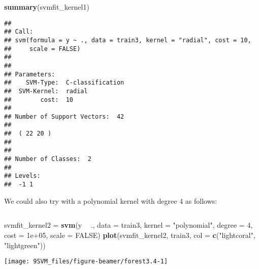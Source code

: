 \documentclass[10pt,ignorenonframetext,]{beamer}
\newenvironment{Shaded}{\begin{snugshade}}{\end{snugshade}}
\newcommand{\DataTypeTok}[1]{\textcolor[rgb]{0.13,0.29,0.53}{#1}}
\newcommand{\DecValTok}[1]{\textcolor[rgb]{0.00,0.00,0.81}{#1}}
\newcommand{\FloatTok}[1]{\textcolor[rgb]{0.00,0.00,0.81}{#1}}
\newcommand{\KeywordTok}[1]{\textcolor[rgb]{0.13,0.29,0.53}{\textbf{#1}}}
\newcommand{\NormalTok}[1]{#1}
\newcommand{\OperatorTok}[1]{\textcolor[rgb]{0.81,0.36,0.00}{\textbf{#1}}}
\newcommand{\OtherTok}[1]{\textcolor[rgb]{0.56,0.35,0.01}{#1}}
\newcommand{\StringTok}[1]{\textcolor[rgb]{0.31,0.60,0.02}{#1}}
\begin{document}
\begin{frame}[fragile]

\scriptsize

\begin{Shaded}
\begin{Highlighting}[]
\KeywordTok{summary}\NormalTok{(svmfit_kernel1)}
\end{Highlighting}
\end{Shaded}

\begin{verbatim}
## 
## Call:
## svm(formula = y ~ ., data = train3, kernel = "radial", cost = 10, 
##     scale = FALSE)
## 
## 
## Parameters:
##    SVM-Type:  C-classification 
##  SVM-Kernel:  radial 
##        cost:  10 
## 
## Number of Support Vectors:  42
## 
##  ( 22 20 )
## 
## 
## Number of Classes:  2 
## 
## Levels: 
##  -1 1
\end{verbatim}

\normalsize

\end{frame}

\begin{frame}[fragile]

We could also try with a polynomial kernel with degree 4 as follows:

\(~\)

\scriptsize

\begin{Shaded}
\begin{Highlighting}[]
\NormalTok{svmfit_kernel2 =}\StringTok{ }\KeywordTok{svm}\NormalTok{(y }\OperatorTok{~}\StringTok{ }\NormalTok{., }\DataTypeTok{data =}\NormalTok{ train3, }\DataTypeTok{kernel =} \StringTok{"polynomial"}\NormalTok{, }\DataTypeTok{degree =} \DecValTok{4}\NormalTok{, }
    \DataTypeTok{cost =} \FloatTok{1e+05}\NormalTok{, }\DataTypeTok{scale =} \OtherTok{FALSE}\NormalTok{)}
\KeywordTok{plot}\NormalTok{(svmfit_kernel2, train3, }\DataTypeTok{col =} \KeywordTok{c}\NormalTok{(}\StringTok{"lightcoral"}\NormalTok{, }\StringTok{"lightgreen"}\NormalTok{))}
\end{Highlighting}
\end{Shaded}

\begin{center}\texttt{[image: 9SVM\_files/figure-beamer/forest3.4-1]} \end{center}

\end{frame}
\end{document}
